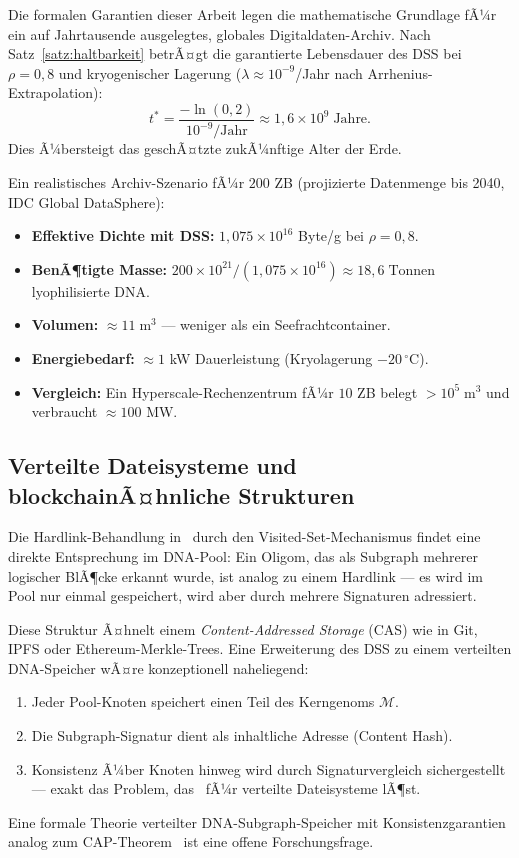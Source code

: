 ﻿\documentclass[a4paper,12pt]{article}
\theoremstyle{definition}
\theoremstyle{plain}
\begin{document}
Die formalen Garantien dieser Arbeit legen die mathematische Grundlage
fÃ¼r ein auf Jahrtausende ausgelegtes, globales Digitaldaten-Archiv.  Nach
Satz~\ref{satz:haltbarkeit} betrÃ¤gt die garantierte Lebensdauer des DSS
bei $\rho = 0{,}8$ und kryogenischer Lagerung
($\lambda \approx 10^{-9}$/Jahr nach Arrhenius-Extrapolation):
\[
  t^* = \frac{-\ln(0{,}2)}{10^{-9}/\text{Jahr}} \approx 1{,}6 \times 10^9\;\text{Jahre}.
\]
Dies Ã¼bersteigt das geschÃ¤tzte zukÃ¼nftige Alter der Erde.

Ein realistisches Archiv-Szenario fÃ¼r $200$ ZB (projizierte Datenmenge
bis 2040, IDC Global DataSphere):
\begin{itemize}
  \item \textbf{Effektive Dichte mit DSS:}
        $1{,}075 \times 10^{16}$ Byte/g bei $\rho = 0{,}8$.
  \item \textbf{BenÃ¶tigte Masse:}
        $200 \times 10^{21} / (1{,}075 \times 10^{16}) \approx 18{,}6\;\text{Tonnen}$
        lyophilisierte DNA.
  \item \textbf{Volumen:} $\approx 11\;\text{m}^3$ --- weniger als ein
        Seefrachtcontainer.
  \item \textbf{Energiebedarf:} $\approx 1$ kW Dauerleistung (Kryolagerung
        $-20\,^\circ\mathrm{C}$).
  \item \textbf{Vergleich:} Ein Hyperscale-Rechenzentrum fÃ¼r $10$ ZB
        belegt $> 10^5\;\text{m}^3$ und verbraucht $\approx 100$ MW.
\end{itemize}

\subsection{Verteilte Dateisysteme und blockchainÃ¤hnliche Strukturen}
\label{ssec:verteilung}

Die Hardlink-Behandlung in~\cite{dusgraph} durch den Visited-Set-Mechanismus
findet eine direkte Entsprechung im DNA-Pool: Ein Oligom, das als Subgraph
mehrerer logischer BlÃ¶cke erkannt wurde, ist analog zu einem Hardlink ---
es wird im Pool nur einmal gespeichert, wird aber durch mehrere Signaturen
adressiert.

Diese Struktur Ã¤hnelt einem \emph{Content-Addressed Storage} (CAS) wie
in Git, IPFS oder Ethereum-Merkle-Trees.  Eine Erweiterung des DSS
zu einem verteilten DNA-Speicher wÃ¤re konzeptionell naheliegend:
\begin{enumerate}
  \item Jeder Pool-Knoten speichert einen Teil des Kerngenoms $\mathcal{M}$.
  \item Die Subgraph-Signatur dient als inhaltliche Adresse (Content Hash).
  \item Konsistenz Ã¼ber Knoten hinweg wird durch Signaturvergleich
        sichergestellt --- exakt das Problem, das~\cite{dusgraph} fÃ¼r
        verteilte Dateisysteme lÃ¶st.
\end{enumerate}
Eine formale Theorie verteilter DNA-Subgraph-Speicher mit Konsistenzgarantien
analog zum CAP-Theorem~\cite{brewer2000} ist eine offene Forschungsfrage.
\end{document}
